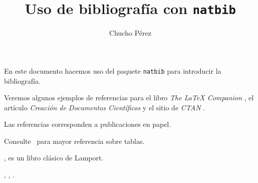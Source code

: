 \documentclass{article}
\title{Uso de bibliografía con \texttt{natbib}}
\author{Chucho Pérez}
\date{}
\begin{document}
 
\maketitle
 
En este documento hacemos uso del paquete \texttt{natbib} para introducir la bibliografía. 

Veremos algunos ejemplos de referencias para el libro \textit{The \LaTeX{} Companion} \citet{latexCompanion}, el artículo 
\textit{Creación de Documentos Científicos} \citep[página 90]{lamportLatex} y el sitio de \textit{CTAN} \cite{ctanWebsite}.

Las referencias \cite{latexCompanion,lamportLatex} corresponden a publicaciones en papel.

Consulte~\citet*{latexCompanion} para mayor referencia sobre tablas.

\citep[vea][página 90]{lamportLatex}, es un libro clásico de Lamport.

\citeauthor{lamportLatex}, \citeyear{lamportLatex}, \citeyearpar{lamportLatex}.

\medskip
 

%
%
%
%
%
%
%

%
%


 
\end{document}

